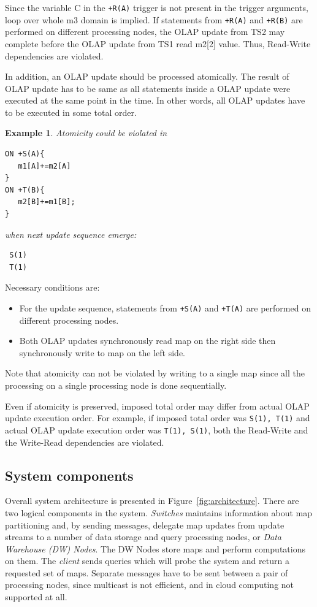 \documentclass{sig-semester}
\newtheorem{example}[theorem]{Example}
\def\OLAP{OLAP\xspace}
\def\EXORD{actual OLAP update execution order\xspace}
\begin{document}
Since the variable C in the \texttt{+R(A)} trigger is not present in the trigger arguments, loop over whole m3 domain is implied. If statements from \texttt{+R(A)} and \texttt{+R(B)} are performed on different processing nodes, the \OLAP update from TS2 may complete before the \OLAP update from TS1 read m2[2] value. Thus, Read-Write dependencies are violated.

In addition, an \OLAP update should be processed atomically. The result of \OLAP update has to be same as all statements inside a \OLAP update were executed at the same point in the time. In other words, all \OLAP updates have to be executed in some total order.

\begin{example} \em
\label{ex:mulInput}
Atomicity could be violated in
\begin{verbatim}
ON +S(A){
   m1[A]+=m2[A]
}
ON +T(B){
   m2[B]+=m1[B];
}\end{verbatim}
when next update sequence emerge:
\begin{verbatim}
 S(1)
 T(1)
\end{verbatim}
\end{example}
Necessary conditions are:
\begin{itemize}
 \item For the update sequence, statements from \texttt{+S(A)} and \texttt{+T(A)} are performed on different processing nodes.
 \item Both \OLAP updates synchronously read map on the right side then synchronously write to map on the left side. 
\end{itemize}

Note that atomicity can not be violated by writing to a single map since all the processing on a single processing node is done sequentially.

Even if atomicity is preserved, imposed total order may differ from \EXORD. For example, if imposed total order was \texttt{S(1), T(1)} and \EXORD was \texttt{T(1), S(1)}, both the Read-Write and the Write-Read dependencies are violated.

\subsection{System components}
\label{Components}
\vspace{2mm}

Overall system architecture is presented in Figure~\ref{fig:architecture}. There are two logical components in the system.
\textit{Switches} maintains information about map partitioning and, by sending messages, delegate map updates from update streams to a number of data storage and query processing nodes, or \textit{Data Warehouse (DW) Nodes}. The DW Nodes store maps and perform computations on them. The \textit{client} sends queries which will probe the system and return a requested set of maps. Separate messages have to be sent between a pair of processing nodes, since multicast is not efficient, and in cloud computing not supported at all.
\end{document}
